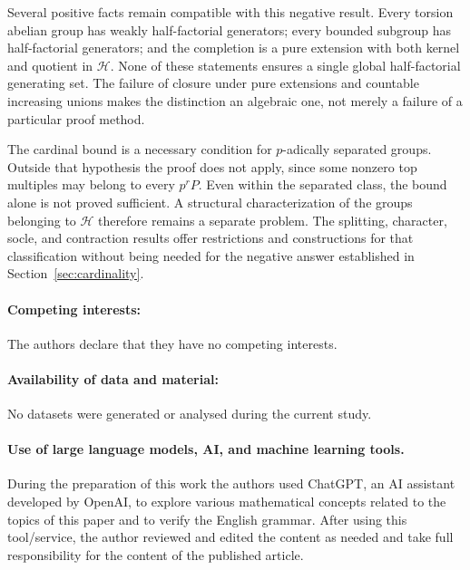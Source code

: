 \documentclass[11pt,reqno]{amsart}
\numberwithin{equation}{section}
\theoremstyle{definition}
\theoremstyle{remark}
\newcommand{\HF}{\mathcal H}
\begin{document}
Several positive facts remain compatible with this negative result.
Every torsion abelian group has weakly half-factorial generators;
every bounded subgroup has half-factorial generators; and the
completion is a pure extension with both kernel and quotient in
$\HF$. None of these statements ensures a single global
half-factorial generating set. The failure of closure under pure
extensions and countable increasing unions makes the distinction
an algebraic one, not merely a failure of a particular proof method.

The cardinal bound is a necessary condition for $p$-adically
separated groups. Outside that hypothesis the proof does not apply,
since some nonzero top multiples may belong to every $p^rP$.
Even within the separated class, the bound alone is not proved
sufficient. A structural characterization of the groups belonging
to $\HF$ therefore remains a separate problem. The splitting,
character, socle, and contraction results offer restrictions and
constructions for that classification without being needed for the
negative answer established in Section~\ref{sec:cardinality}.

\bigskip

\paragraph{\bf Competing interests:} The authors declare that they have no competing interests.

\medskip

\paragraph{\bf Availability of data and material:}
No datasets were generated or analysed during the current study.

\medskip

\paragraph{\bf Use of large language models, AI, and machine learning tools.} 
During the preparation of this work the authors
used ChatGPT, an AI assistant developed by OpenAI, to explore various mathematical concepts related to the topics of this paper and to verify the English grammar. After using this tool/service,
the author reviewed and edited the content as needed and take full responsibility
for the content of the published article.

\medskip
\end{document}
